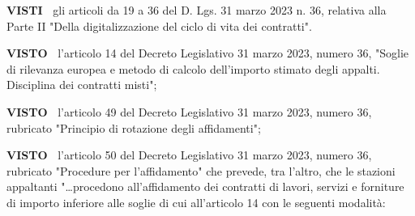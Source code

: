 \textbf{VISTI~}	gli articoli da 19 a 36 del D. Lgs. 31 marzo 2023 n. 36,
relativa alla Parte II "Della digitalizzazione del ciclo di vita dei
contratti".

\textbf{VISTO~}                   l’articolo 14 del Decreto Legislativo
31 marzo 2023, numero 36, "Soglie di rilevanza    europea e metodo di
calcolo dell’importo stimato degli appalti. Disciplina dei contratti
misti"; 

\textbf{VISTO~}	l’articolo 49 del Decreto Legislativo 31 marzo 2023,
numero 36, rubricato "Principio di rotazione degli affidamenti";


\textbf{VISTO~}	l’articolo 50 del Decreto Legislativo 31 marzo 2023,
numero 36, rubricato "Procedure per l’affidamento" che prevede,
tra l’altro, che le stazioni appaltanti "…procedono all'affidamento
dei contratti di lavori, servizi e forniture di importo inferiore alle
soglie di cui all'articolo 14 con le seguenti modalità:



